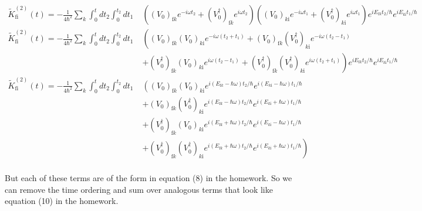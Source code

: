\documentclass[]{article}
\begin{document}
\begin{enumerate}[1)]
\begin{enumerate}[a)]
\begin{equation}
\begin{split}
\tilde{K}^{(2)}_\text{fi} (t) = - \frac{1}{4 \hbar^2} \sum_k \int_0^t dt_2 \int_0^{t_2} dt_1 \;  & \left( (V_0)_{\text{f} k } e^{ - i \omega t_2} +  (V_0^\dagger)_{\text{f} k } e^{ i \omega t_2}   \right) \left( (V_0)_{  k \text{i} } e^{ - i \omega t_1} +  (V_0^\dagger)_{  k \text{i}} e^{ i \omega t_1}   \right)   e^{  i E_{ \text{f} k } t_2 / \hbar } e^{  i E_{ k \text{i}  } t_1 / \hbar } \\
%
\tilde{K}^{(2)}_\text{fi} (t) =  - \frac{1}{4 \hbar^2} \sum_k \int_0^t dt_2 \int_0^{t_2} dt_1 \; & \left(  (V_0)_{\text{f} k }  (V_0)_{  k \text{i} } e^{ - i \omega ( t_2 + t_1) }
+ (V_0)_{\text{f} k } (V_0^\dagger)_{  k \text{i}}   e^{ - i \omega ( t_2 - t_1) } \right. \\
& \left.  +  (V_0^\dagger)_{\text{f} k }  (V_0)_{  k \text{i} } e^{ i \omega ( t_2 - t_1) } 
+  (V_0^\dagger)_{\text{f} k }   (V_0^\dagger)_{  k \text{i}}   e^{ i \omega ( t_2 +  t_1) }
%
\right)   e^{  i E_{ \text{f} k } t_2 / \hbar } e^{  i E_{ k \text{i}  } t_1 / \hbar }
\\
%
\tilde{K}^{(2)}_\text{fi} (t) =  - \frac{1}{4 \hbar^2} \sum_k \int_0^t dt_2 \int_0^{t_2} dt_1 \; & \left(  (V_0)_{\text{f} k }  (V_0)_{  k \text{i} } e^{  i ( E_{ \text{f} k } - \hbar \omega )t_2 / \hbar } e^{  i ( E_{ k \text{i}  } - \hbar \omega) t_1 / \hbar } \right. \\
& \left. + (V_0)_{\text{f} k } (V_0^\dagger)_{  k \text{i}}  
e^{  i ( E_{ \text{f} k } - \hbar \omega )t_2 / \hbar } e^{  i ( E_{ k \text{i}  } + \hbar \omega) t_1 / \hbar }
 \right. \\
& \left.  +  (V_0^\dagger)_{\text{f} k }  (V_0)_{  k \text{i} } e^{  i ( E_{ \text{f} k } +  \hbar \omega )t_2 / \hbar } e^{  i ( E_{ k \text{i}  } - \hbar \omega) t_1 / \hbar }
\right. \\
& \left. +  (V_0^\dagger)_{\text{f} k }   (V_0^\dagger)_{  k \text{i}}   e^{  i ( E_{ \text{f} k } +  \hbar \omega )t_2 / \hbar } e^{  i ( E_{ k \text{i}  } + \hbar \omega) t_1 / \hbar }
%
\right)   
\\
%
\end{split}
\end{equation}

But each of these terms are of the form in equation (8) in the homework. So we can remove the time ordering and sum over analogous terms that look like equation (10) in the homework. \\


\end{enumerate}
\end{enumerate}
\end{document}
